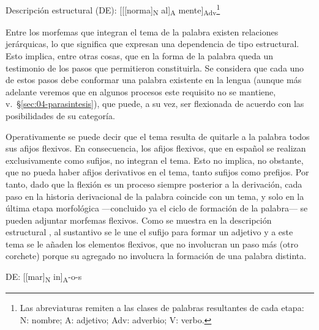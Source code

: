 \begin{exe}
  \ex\label{ex:04-normalmente} Descripción estructural (DE):
      [[[norma]\textsubscript{N} al]\textsubscript{A} mente]\textsubscript{Adv}\footnote{Las
      abreviaturas remiten a las clases de palabras resultantes de cada etapa:
      N: nombre; A: adjetivo; Adv: adverbio; V: verbo.}
\end{exe}

Entre los morfemas que integran el tema de la palabra existen relaciones
jerárquicas, lo que significa que expresan una dependencia de tipo estructural.
Esto implica, entre otras cosas, que en la forma de la palabra queda un
testimonio de los pasos que permitieron constituirla. Se considera que cada uno
de estos pasos debe conformar una palabra existente en la lengua (aunque más
adelante veremos que en algunos procesos este requisito no se mantiene,
v.~§\ref{sec:04-parasintesis}), que puede, a su vez, ser flexionada de acuerdo
con las posibilidades de su categoría.

Operativamente se puede decir que el tema resulta de quitarle a la palabra todos
sus afijos flexivos. En consecuencia, los afijos flexivos, que en español se
realizan exclusivamente como sufijos, no integran el tema. Esto no implica, no
obstante, que no pueda haber afijos derivativos en el tema, tanto sufijos como
prefijos. Por tanto, dado que la flexión es un proceso siempre posterior a la
derivación, cada paso en la historia derivacional de la palabra coincide con un
tema, y solo en la última etapa morfológica ---concluido ya el ciclo de
formación de la palabra--- se pueden adjuntar morfemas flexivos. Como se muestra
en la descripción estructural , al sustantivo 
se le une el sufijo  para formar un adjetivo y a este tema se le
añaden los elementos flexivos, que no involucran un paso más (otro corchete)
porque su agregado no involucra la formación de una palabra distinta.

\begin{exe}
  \ex\label{ex:04-marinos} DE: [[mar]\textsubscript{N} in]\textsubscript{A}-o-s
\end{exe}


